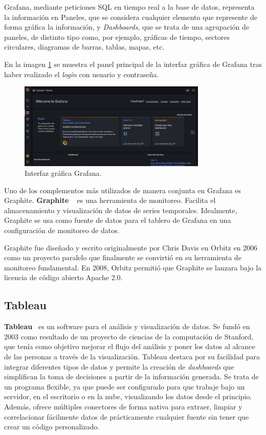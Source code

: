 \documentclass[a4paper, 12pt]{book}
\begin{document}
Grafana, mediante peticiones SQL en tiempo real a la base de datos, representa la información en Paneles, que se considera cualquier elemento que represente de forma gráfica la información, y \textit{Dashboards}, que se trata de una agrupación de paneles, de distinto tipo como, por ejemplo, gráficas de tiempo, sectores circulares, diagramas de barras, tablas, mapas, etc.

En la imagen \ref{figura:Grafana} se muestra  el panel principal de la interfaz gráfica de Grafana tras haber realizado el \emph{login} con usuario y contraseña.

\begin{figure}[ht]
        \centering
        \includegraphics[width=0.8\textwidth]{img/Grafana.png}
        \caption{Interfaz gráfica Grafana.}
        \label{figura:Grafana}
    \end{figure}

Uno de los complementos más utilizados de manera conjunta en Grafana es Graphite.
\textbf{Graphite} ~\cite{Graphite} es una herramienta de monitoreo. Facilita el almacenamiento y visualización de datos de series temporales. Idealmente, Graphite se usa como fuente de datos para el tablero de Grafana en una configuración de monitoreo de datos.

Graphite fue diseñado y escrito originalmente por Chris Davis en Orbitz en 2006 como un proyecto paralelo que finalmente se convirtió en su herramienta de monitoreo fundamental. En 2008, Orbitz permitió que Graphite se lanzara bajo la licencia de código abierto Apache 2.0. 

\subsection{Tableau}
\label{sec:tableau}

\textbf{Tableau}~\cite{Tableau} es un software para el análisis y visualización de datos. Se fundó en 2003 como resultado de un proyecto de ciencias de la computación de Stanford, que tenía como objetivo mejorar el flujo del análisis y poner los datos al alcance de las personas a través de la visualización.  
Tableau destaca por su facilidad para integrar diferentes tipos de datos y permite la creación de \textit{dashboards} que simplifican la toma de decisiones a partir de la información generada. Se trata de un programa flexible, ya que puede ser configurado para que trabaje bajo un servidor, en el escritorio o en la nube, visualizando los datos desde el principio. Además, ofrece múltiples conectores de forma nativa para extraer, limpiar y correlacionar fácilmente datos de prácticamente cualquier fuente sin tener que crear un código personalizado.
\end{document}
